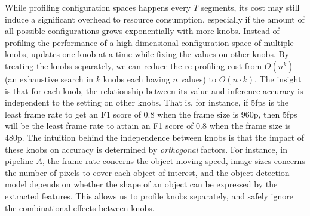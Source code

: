 While profiling configuration spaces happens every $T$ segments, 
its cost may still induce a significant overhead to resource
consumption,
especially if the amount of all possible configurations grows
exponentially with more knobs.
Instead of profiling the performance of a high 
dimensional configuration space of multiple knobs, \name
updates one knob at a time while fixing the values on other
knobs.
By treating the knobs separately, we can reduce the 
re-profiling cost from $O(n^k)$ (an exhaustive search in $k$
knobs each having $n$ values) to $O(n\cdot k)$.
The insight is that 
for each knob, the relationship between its value and inference 
accuracy is independent to the setting on other knobs. 
That is, for instance, if 5fps is the least frame rate to get an F1 
score of 0.8 when the frame size is 960p, then 5fps will be the
least frame rate to attain an F1 score of 0.8 when the frame size 
is 480p.
The intuition behind the independence between knobs is that the 
impact of these knobs on accuracy is determined by {\em orthogonal} 
factors. 
For instance, in pipeline $A$, the frame rate concerns the object
moving speed, image sizes concerns the number of pixels to cover 
each object of interest, and the object detection model depends on 
whether the shape of an object can be expressed by the extracted 
features.
This allows us to profile knobs separately, and safely ignore the 
combinational effects between knobs.


